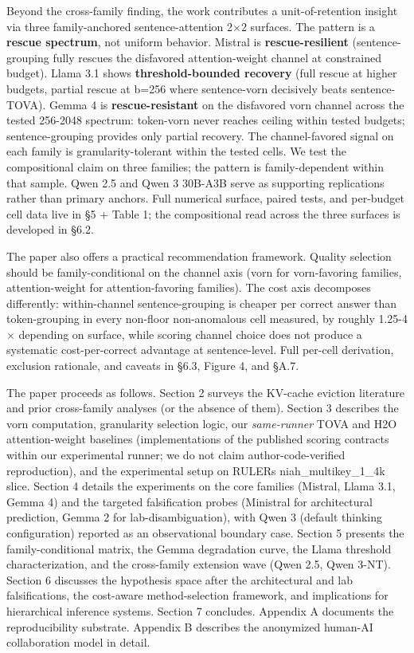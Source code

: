 \documentclass[10pt]{article}
\begin{document}
Beyond the cross-family finding, the work contributes a
unit-of-retention insight via three family-anchored sentence-attention
2$\times$2 surfaces. The pattern is a \textbf{rescue spectrum}, not uniform
behavior. Mistral is \textbf{rescue-resilient} (sentence-grouping fully
rescues the disfavored attention-weight channel at constrained budget).
Llama 3.1 shows \textbf{threshold-bounded recovery} (full rescue at
higher budgets, partial rescue at b=256 where sentence-vorn decisively
beats sentence-TOVA). Gemma 4 is
\textbf{rescue-resistant} on the disfavored vorn channel across the
tested 256-2048 spectrum: token-vorn never reaches ceiling within tested
budgets; sentence-grouping provides only partial recovery. The
channel-favored signal on each family is granularity-tolerant within the
tested cells. We test the compositional claim on three families; the
pattern is family-dependent within that sample. Qwen 2.5 and
Qwen 3 30B-A3B serve as supporting replications rather than primary
anchors. Full numerical surface,
paired tests, and per-budget cell data live in \S{}5 + Table 1; the
compositional read across the three surfaces is developed in \S{}6.2.

The paper also offers a practical recommendation framework. Quality
selection should be family-conditional on the channel axis (vorn for
vorn-favoring families, attention-weight for attention-favoring
families). The cost axis decomposes differently: within-channel
sentence-grouping is cheaper per correct answer than token-grouping in
every non-floor non-anomalous cell measured, by roughly 1.25-4$\times$
depending on surface, while scoring channel choice does not produce
a systematic cost-per-correct advantage at sentence-level. Full per-cell derivation, exclusion
rationale, and caveats in \S{}6.3, Figure 4, and \S{}A.7.

The paper proceeds as follows. Section 2 surveys the KV-cache eviction
literature and prior cross-family analyses (or the absence of them).
Section 3 describes the vorn computation, granularity selection logic,
our \emph{same-runner} TOVA and H2O attention-weight baselines
(implementations of the published scoring contracts within our
experimental runner; we do not claim author-code-verified
reproduction), and the experimental setup on RULER\textquotesingle s
niah\_multikey\_1\_4k slice. Section 4 details the experiments on the core families
(Mistral, Llama 3.1, Gemma 4) and the targeted falsification probes
(Ministral for architectural prediction, Gemma 2 for lab-disambiguation),
with Qwen 3 (default thinking configuration) reported as an
observational boundary case. Section 5 presents the family-conditional
matrix, the Gemma degradation curve, the Llama threshold
characterization, and the cross-family extension wave (Qwen 2.5,
Qwen 3-NT). Section 6 discusses the
hypothesis space after the architectural and lab falsifications, the
cost-aware method-selection framework, and implications for hierarchical
inference systems. Section 7 concludes. Appendix A documents the
reproducibility substrate. Appendix B describes the anonymized human-AI collaboration
model in detail.
\end{document}
